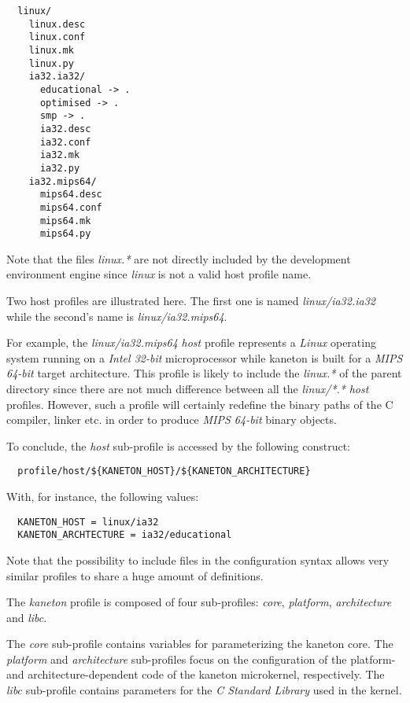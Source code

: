 \begin{verbatim}
  linux/
    linux.desc
    linux.conf
    linux.mk
    linux.py
    ia32.ia32/
      educational -> .
      optimised -> .
      smp -> .
      ia32.desc
      ia32.conf
      ia32.mk
      ia32.py
    ia32.mips64/
      mips64.desc
      mips64.conf
      mips64.mk
      mips64.py
\end{verbatim}

Note that the files \textit{linux.*} are not directly included by the
development environment engine since \textit{linux} is not a valid host
profile name.

Two host profiles are illustrated here. The first one is named
\textit{linux/ia32.ia32} while the second's name is \textit{linux/ia32.mips64}.

For example, the \textit{linux/ia32.mips64} \textit{host} profile represents a
\textit{Linux} operating system running on a \textit{Intel 32-bit}
microprocessor while kaneton is built for a \textit{MIPS 64-bit} target
architecture. This profile is likely to include the \textit{linux.*} of the
parent directory since there are not much difference between all the
\textit{linux/*.*} \textit{host} profiles. However, such a profile will
certainly redefine the binary paths of the C compiler, linker etc. in order
to produce \textit{MIPS 64-bit} binary objects.

To conclude, the \textit{host} sub-profile is accessed by the following
construct:

\begin{verbatim}
  profile/host/${KANETON_HOST}/${KANETON_ARCHITECTURE}
\end{verbatim}

With, for instance, the following values:

\begin{verbatim}
  KANETON_HOST = linux/ia32
  KANETON_ARCHTECTURE = ia32/educational
\end{verbatim}

Note that the possibility to include files in the configuration syntax allows
very similar profiles to share a huge amount of definitions.



The \textit{kaneton} profile is composed of four sub-profiles: \textit{core},
\textit{platform}, \textit{architecture} and \textit{libc}.

The \textit{core} sub-profile contains variables for parameterizing the
kaneton core. The \textit{platform} and \textit{architecture} sub-profiles
focus on the configuration of the platform- and architecture-dependent code
of the kaneton microkernel, respectively. The \textit{libc} sub-profile
contains parameters for the \textit{C Standard Library} used in the kernel.

